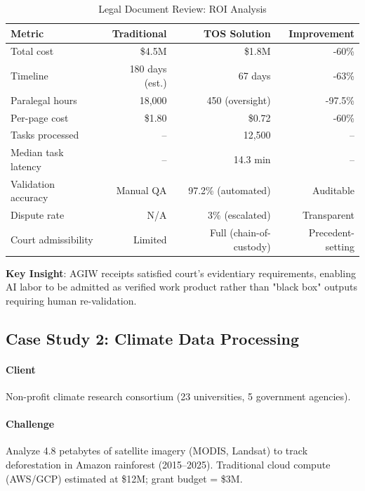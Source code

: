 \documentclass[11pt]{article}
\begin{document}
\begin{table}[H]
\centering
\caption{Legal Document Review: ROI Analysis}
\label{tab:legal-roi}
\begin{tabular}{@{}lrrr@{}}
\toprule
\textbf{Metric} & \textbf{Traditional} & \textbf{TOS Solution} & \textbf{Improvement} \\ \midrule
Total cost & \$4.5M & \$1.8M & -60\% \\
Timeline & 180 days (est.) & 67 days & -63\% \\
Paralegal hours & 18,000 & 450 (oversight) & -97.5\% \\
Per-page cost & \$1.80 & \$0.72 & -60\% \\
Tasks processed & -- & 12,500 & -- \\
Median task latency & -- & 14.3 min & -- \\
Validation accuracy & Manual QA & 97.2\% (automated) & Auditable \\
Dispute rate & N/A & 3\% (escalated) & Transparent \\
Court admissibility & Limited & Full (chain-of-custody) & Precedent-setting \\
\bottomrule
\end{tabular}
\end{table}

\textbf{Key Insight}: AGIW receipts satisfied court's evidentiary requirements, enabling AI labor to be admitted as verified work product rather than "black box" outputs requiring human re-validation.

\subsection{Case Study 2: Climate Data Processing}

\paragraph{Client} Non-profit climate research consortium (23 universities, 5 government agencies).

\paragraph{Challenge} Analyze 4.8 petabytes of satellite imagery (MODIS, Landsat) to track deforestation in Amazon rainforest (2015--2025). Traditional cloud compute (AWS/GCP) estimated at \$12M; grant budget = \$3M.
\end{document}
